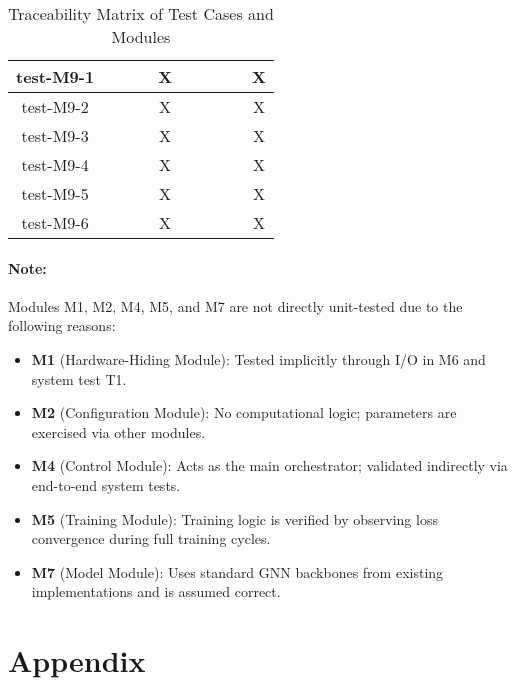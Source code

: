 \documentclass[12pt, titlepage]{article}
\begin{document}
\begin{table}[h!]
\begin{tabular}{|c|c|c|c|c|c|c|c|c|c|}
  test-M9-1   &     &     &     &  X   &     &     &     &     & X   \\ \hline
  test-M9-2   &     &     &     &  X   &     &     &     &     & X   \\ \hline
  test-M9-3   &     &     &     &  X   &     &     &     &     & X   \\ \hline
  test-M9-4   &     &     &     &  X   &     &     &     &     & X   \\ \hline
  test-M9-5   &     &     &     &  X   &     &     &     &     & X   \\ \hline
  test-M9-6   &     &     &     &  X   &     &     &     &     & X   \\ \hline
  \end{tabular}
  \caption{Traceability Matrix of Test Cases and Modules}
  \label{Table:trace-test-modules}
\end{table}

\paragraph{Note:}
Modules M1, M2, M4, M5, and M7 are not directly unit-tested due to the following reasons:

\begin{itemize}
  \item \textbf{M1} (Hardware-Hiding Module): Tested implicitly through I/O in M6 and system test T1.
  \item \textbf{M2} (Configuration Module): No computational logic; parameters are exercised via other modules.
  \item \textbf{M4} (Control Module): Acts as the main orchestrator; validated indirectly via end-to-end system tests.
  \item \textbf{M5} (Training Module): Training logic is verified by observing loss convergence during full training cycles.
  \item \textbf{M7} (Model Module): Uses standard GNN backbones from existing implementations and is assumed correct.
\end{itemize}


				



%

\newpage

\section{Appendix}
\end{document}

